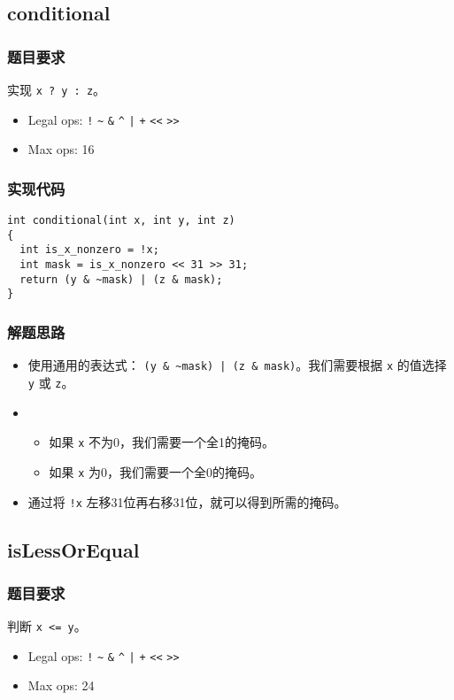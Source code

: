 \documentclass{article}
\begin{document}
\subsection{conditional}
\subsubsection{题目要求}
实现 \texttt{x ? y : z}。
\begin{itemize}
    \item Legal ops: \texttt{!} \texttt{\~{}} \texttt{\&} \texttt{\^{}} \texttt{|} \texttt{+} \texttt{<<} \texttt{>>}
    \item Max ops: 16
\end{itemize}

\subsubsection{实现代码}
\begin{lstlisting}[caption={conditional}]
int conditional(int x, int y, int z)
{
  int is_x_nonzero = !x;
  int mask = is_x_nonzero << 31 >> 31;
  return (y & ~mask) | (z & mask);
}
\end{lstlisting}

\subsubsection{解题思路}
\begin{itemize}
  \item 使用通用的表达式： \texttt{(y \& \~{}mask) | (z \& mask)}。我们需要根据 \texttt{x} 的值选择 \texttt{y} 或 \texttt{z}。
  \item \begin{itemize}
    \item 如果 \texttt{x} 不为0，我们需要一个全1的掩码。
    \item 如果 \texttt{x} 为0，我们需要一个全0的掩码。
  \end{itemize}
  \item 通过将 \texttt{!x} 左移31位再右移31位，就可以得到所需的掩码。
\end{itemize}

\subsection{isLessOrEqual}
\subsubsection{题目要求}
判断 \texttt{x <= y}。
\begin{itemize}
    \item Legal ops: \texttt{!} \texttt{\~{}} \texttt{\&} \texttt{\^{}} \texttt{|} \texttt{+} \texttt{<<} \texttt{>>}
    \item Max ops: 24
\end{itemize}
\end{document}

